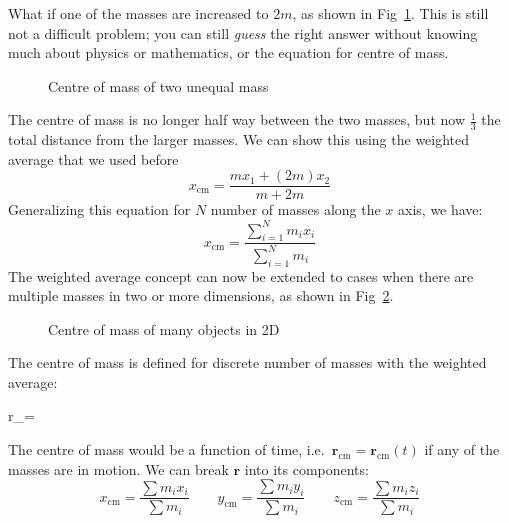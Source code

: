 What if one of the masses are increased to $2m$, as shown in
Fig~\ref{fig:unequal-masses}. This is still not a difficult problem; you can
still \emph{guess} the right answer without knowing much about physics or
mathematics, or the equation for centre of mass. 
\begin{figure}[ht]
  \centering
  \caption{Centre of mass of two unequal mass}
  \label{fig:unequal-masses}
\end{figure}
The centre of mass is no longer half way between the two masses, but now
$\frac13$ the total distance from the larger masses. We can show this using the
weighted average that we used before
\begin{equation*}
  x_\text{cm}=\frac{mx_1+(2m)x_2}{m+2m}
\end{equation*}
Generalizing this equation for $N$ number of masses along the $x$ axis, we
have:
\begin{equation}
  x_\text{cm}=\frac{\sum_{i=1}^Nm_ix_i}{\sum_{i=1}^N m_i}
\end{equation}
The weighted average concept can now be extended to cases when there are
multiple masses in two or more dimensions, as shown in
Fig~\ref{2d-many-masses}.
\begin{figure}[ht]
  \centering
  \caption{Centre of mass of many objects in 2D}
  \label{2d-many-masses}
\end{figure}
The centre of mass is defined for discrete number of masses with the weighted
average:
\begin{important-equation}
  \bm r_=
  \label{eq:cm-summation}
\end{important-equation}
The centre of mass would be a function of time, i.e.\
$\bm r_\text{cm}=\bm r_\text{cm}(t)$ if any of the masses are in motion. We can
break $\bm r$ into its components:
\begin{equation*}
  x_\text{cm}=\frac{\sum m_ix_i}{\sum m_i}\quad\quad
  y_\text{cm}=\frac{\sum m_iy_i}{\sum m_i}\quad\quad
  z_\text{cm}=\frac{\sum m_iz_i}{\sum m_i}
\end{equation*}



